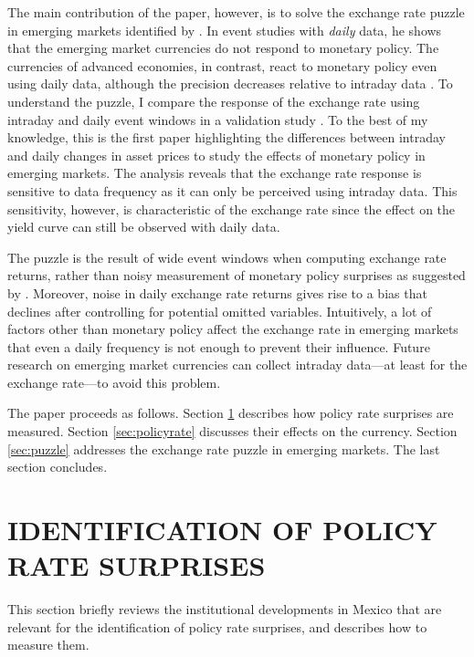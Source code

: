 \documentclass[a4paper,12pt]{article} 		%
\newcommand{\sectitlespace}{\vspace{0.1in}}
\begin{document}
The main contribution of the paper, however, is to solve the exchange rate puzzle in emerging markets identified by \textcite{Kohlscheen:2014}. In event studies with \textit{daily} data, he shows that the emerging market currencies do not respond to monetary policy. The currencies of advanced economies, in contrast, react to monetary policy even using daily data, although the precision decreases relative to intraday data \parencite{Wright:2012, FerrariKearnsSchrimpf:2021}. To understand the puzzle, I compare the response of the exchange rate using intraday and daily event windows in a validation study \parencite{Boundetal:1994}. To the best of my knowledge, this is the first paper highlighting the differences between intraday and daily changes in asset prices to study the effects of monetary policy in emerging markets. The analysis reveals that the exchange rate response is sensitive to data frequency as it can only be perceived using intraday data. This sensitivity, however, is characteristic of the exchange rate since the effect on the yield curve can still be observed with daily data. 

The puzzle is the result of wide event windows when computing exchange rate returns, rather than noisy measurement of monetary policy surprises as suggested by \textcite{PenningsRamayandiTang:2015}. Moreover, noise in daily exchange rate returns gives rise to a bias that declines after controlling for potential omitted variables. Intuitively, a lot of factors other than monetary policy affect the exchange rate in emerging markets that even a daily frequency is not enough to prevent their influence. Future research on emerging market currencies can collect intraday data---at least for the exchange rate---to avoid this problem. 

The paper proceeds as follows. Section \ref{sec:mpsidentification} describes how policy rate surprises are measured. Section \ref{sec:policyrate} discusses their effects on the currency. Section \ref{sec:puzzle} addresses the exchange rate puzzle in emerging markets. The last section concludes.

\sectitlespace
\section{IDENTIFICATION OF POLICY RATE SURPRISES} \label{sec:mpsidentification}
\sectitlespace

This section briefly reviews the institutional developments in Mexico that are relevant for the identification of policy rate surprises, and describes how to measure them. 
\end{document}
